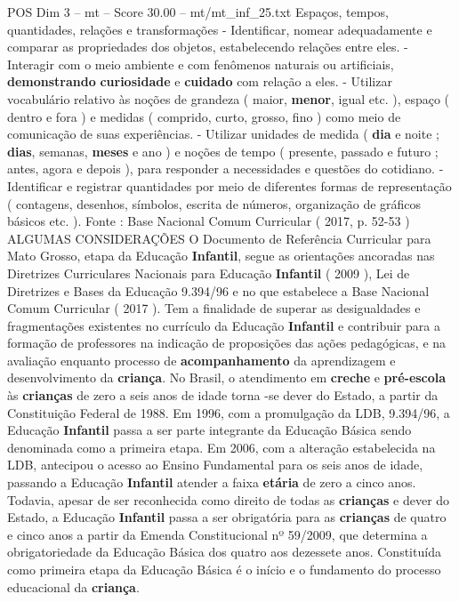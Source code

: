 \begin{textsample}{POS Dim 3 – mt – Score 30.00 – mt/mt\_inf\_25.txt}
Espaços, tempos, quantidades, relações e transformações - Identificar, nomear adequadamente e comparar as propriedades dos objetos, estabelecendo relações entre eles. - Interagir com o meio ambiente e com fenômenos naturais ou artificiais, \textbf{demonstrando} \textbf{curiosidade} e \textbf{cuidado} com relação a eles. - Utilizar vocabulário relativo às noções de grandeza ( maior, \textbf{menor}, igual etc. ), espaço ( dentro e fora ) e medidas ( comprido, curto, grosso, fino ) como meio de comunicação de suas experiências. - Utilizar unidades de medida ( \textbf{dia} e noite ; \textbf{dias}, semanas, \textbf{meses} e ano ) e noções de tempo ( presente, passado e futuro ; antes, agora e depois ), para responder a necessidades e questões do cotidiano. - Identificar e registrar quantidades por meio de diferentes formas de representação ( contagens, desenhos, símbolos, escrita de números, organização de gráficos básicos etc. ).
Fonte : Base Nacional Comum Curricular ( 2017, p. 52-53 ) ALGUMAS CONSIDERAÇÕES O Documento de Referência Curricular para Mato Grosso, etapa da Educação \textbf{Infantil}, segue as orientações ancoradas nas Diretrizes Curriculares Nacionais para Educação \textbf{Infantil} ( 2009 ), Lei de Diretrizes e Bases da Educação 9.394/96 e no que estabelece a Base Nacional Comum Curricular ( 2017 ).
Tem a finalidade de superar as desigualdades e fragmentações existentes no currículo da Educação \textbf{Infantil} e contribuir para a formação de professores na indicação de proposições das ações pedagógicas, e na avaliação enquanto processo de \textbf{acompanhamento} da aprendizagem e desenvolvimento da \textbf{criança}.
No Brasil, o atendimento em \textbf{creche} e \textbf{pré-escola} às \textbf{crianças} de zero a seis anos de idade torna -se dever do Estado, a partir da Constituição Federal de 1988.
Em 1996, com a promulgação da LDB, 9.394/96, a Educação \textbf{Infantil} passa a ser parte integrante da Educação Básica sendo denominada como a primeira etapa.
Em 2006, com a alteração estabelecida na LDB, antecipou o acesso ao Ensino Fundamental para os seis anos de idade, passando a Educação \textbf{Infantil} atender a faixa \textbf{etária} de zero a cinco anos.
Todavia, apesar de ser reconhecida como direito de todas as \textbf{crianças} e dever do Estado, a Educação \textbf{Infantil} passa a ser obrigatória para as \textbf{crianças} de quatro e cinco anos a partir da Emenda Constitucional nº 59/2009, que determina a obrigatoriedade da Educação Básica dos quatro aos dezessete anos.
Constituída como primeira etapa da Educação Básica é o início e o fundamento do processo educacional da \textbf{criança}.

\end{textsample}
